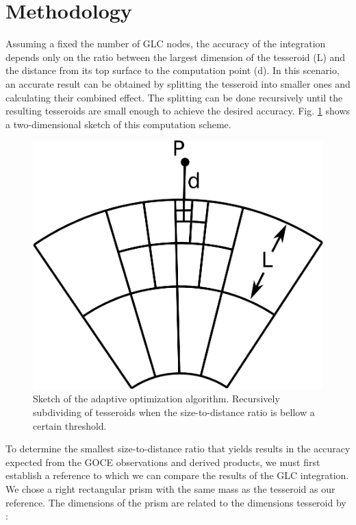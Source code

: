 \documentclass[a4paper,twocolumn]{esapub2005} %
\begin{document}
\section{Methodology}

Assuming a fixed the number of GLC nodes, the accuracy of the integration depends
only on the ratio between the largest dimension of the tesseroid (L) and the distance
from its top surface to the computation point (d).
In this scenario, an accurate result can be obtained by splitting the tesseroid
into smaller ones and calculating their combined effect.
The splitting can be done recursively until the resulting tesseroids are small
enough to achieve the desired accuracy.
Fig. \ref{fig:divide-scheme} shows a two-dimensional sketch of this computation scheme.

\begin{figure}[htb]
    \centering
        \includegraphics[width=\columnwidth]{../figures/divide-scheme.png}
    \caption{Sketch of the adaptive optimization algorithm. Recursively subdividing of
    tesseroids when the size-to-distance ratio is bellow a certain threshold.
    \label{fig:divide-scheme}}
\end{figure}

To determine the smallest size-to-distance ratio that yields results in the accuracy
expected from the GOCE observations and derived products, we must first establish a
reference to which we can compare the results of the GLC integration.
We chose a right rectangular prism with the same mass as the tesseroid as our reference.
The dimensions of the prism are related to the dimensions tesseroid by \citep{wild2008}:
\end{document}
